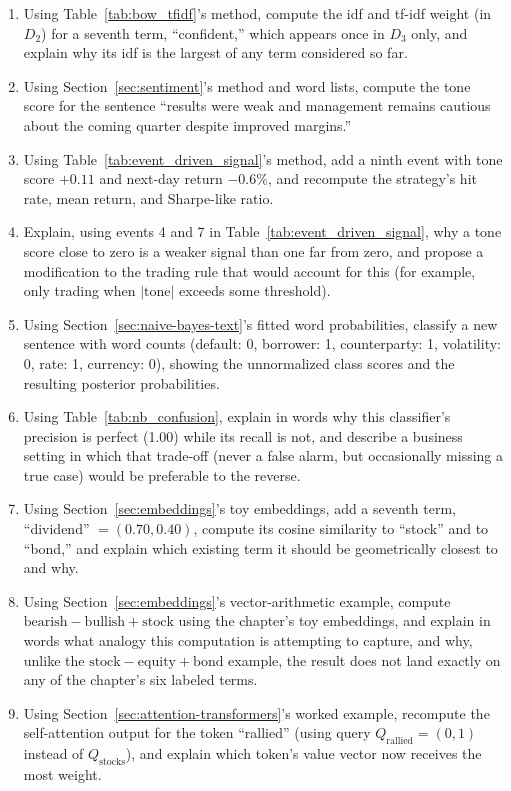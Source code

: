 \documentclass[../ai_in_finance]{subfiles}
\begin{document}
\begin{enumerate}
    \item Using Table~\ref{tab:bow_tfidf}'s method, compute the idf and tf-idf weight (in $D_2$) for a seventh term, ``confident,'' which appears once in $D_3$ only, and explain why its idf is the largest of any term considered so far.
    \item Using Section~\ref{sec:sentiment}'s method and word lists, compute the tone score for the sentence ``results were weak and management remains cautious about the coming quarter despite improved margins.''
    \item Using Table~\ref{tab:event_driven_signal}'s method, add a ninth event with tone score $+0.11$ and next-day return $-0.6\%$, and recompute the strategy's hit rate, mean return, and Sharpe-like ratio.
    \item Explain, using events 4 and 7 in Table~\ref{tab:event_driven_signal}, why a tone score close to zero is a weaker signal than one far from zero, and propose a modification to the trading rule that would account for this (for example, only trading when $|\text{tone}| $ exceeds some threshold).
    \item Using Section~\ref{sec:naive-bayes-text}'s fitted word probabilities, classify a new sentence with word counts (default: 0, borrower: 1, counterparty: 1, volatility: 0, rate: 1, currency: 0), showing the unnormalized class scores and the resulting posterior probabilities.
    \item Using Table~\ref{tab:nb_confusion}, explain in words why this classifier's precision is perfect (1.00) while its recall is not, and describe a business setting in which that trade-off (never a false alarm, but occasionally missing a true case) would be preferable to the reverse.
    \item Using Section~\ref{sec:embeddings}'s toy embeddings, add a seventh term, ``dividend'' $=(0.70, 0.40)$, compute its cosine similarity to ``stock'' and to ``bond,'' and explain which existing term it should be geometrically closest to and why.
    \item Using Section~\ref{sec:embeddings}'s vector-arithmetic example, compute $\text{bearish} - \text{bullish} + \text{stock}$ using the chapter's toy embeddings, and explain in words what analogy this computation is attempting to capture, and why, unlike the $\text{stock}-\text{equity}+\text{bond}$ example, the result does not land exactly on any of the chapter's six labeled terms.
    \item Using Section~\ref{sec:attention-transformers}'s worked example, recompute the self-attention output for the token ``rallied'' (using query $Q_{\text{rallied}} = (0,1)$ instead of $Q_{\text{stocks}}$), and explain which token's value vector now receives the most weight.

\end{enumerate}
\end{document}
